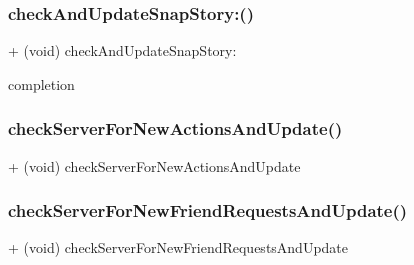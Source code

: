 \hypertarget{interface_restful_snap_c_r_u_d_a86db45997654bed0decf9ed73a270b86}{}\label{interface_restful_snap_c_r_u_d_a86db45997654bed0decf9ed73a270b86} 
\subsubsection{\texorpdfstring{check\+And\+Update\+Snap\+Story\+:()}{checkAndUpdateSnapStory:()}}
{\footnotesize\ttfamily + (void) check\+And\+Update\+Snap\+Story\+: \begin{DoxyParamCaption}\item[{(void($^\wedge$)(B\+O\+OL))}]{completion }\end{DoxyParamCaption}}

\hypertarget{interface_restful_snap_c_r_u_d_a9a44ec05e413439e04303c74bc994eb4}{}\label{interface_restful_snap_c_r_u_d_a9a44ec05e413439e04303c74bc994eb4} 
\subsubsection{\texorpdfstring{check\+Server\+For\+New\+Actions\+And\+Update()}{checkServerForNewActionsAndUpdate()}}
{\footnotesize\ttfamily + (void) check\+Server\+For\+New\+Actions\+And\+Update \begin{DoxyParamCaption}{ }\end{DoxyParamCaption}}

\hypertarget{interface_restful_snap_c_r_u_d_abc7d760ea7967b8346f6c9167651df05}{}\label{interface_restful_snap_c_r_u_d_abc7d760ea7967b8346f6c9167651df05} 
\subsubsection{\texorpdfstring{check\+Server\+For\+New\+Friend\+Requests\+And\+Update()}{checkServerForNewFriendRequestsAndUpdate()}}
{\footnotesize\ttfamily + (void) check\+Server\+For\+New\+Friend\+Requests\+And\+Update \begin{DoxyParamCaption}{ }\end{DoxyParamCaption}}

